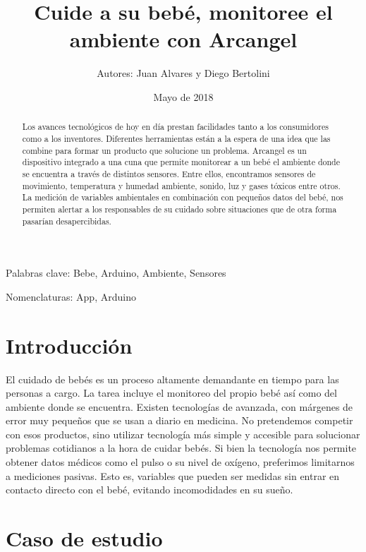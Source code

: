 \documentclass{IEEEtran}
\begin{document}
	\title{Cuide a su bebé, monitoree el ambiente con Arcangel}
	\author{Autores: Juan Alvares y Diego Bertolini}
	\date{Mayo de 2018}	
	\maketitle
	
	\begin{abstract}
		Los avances tecnológicos de hoy en día prestan facilidades tanto a los consumidores como a los inventores. Diferentes herramientas están a la espera de una idea que las combine para formar un producto que solucione un problema.
        Arcangel es un dispositivo integrado a una cuna que permite monitorear a un bebé el ambiente donde se encuentra a través de distintos sensores. Entre ellos, encontramos sensores de movimiento, temperatura y humedad ambiente, sonido, luz y gases tóxicos entre otros. 
        La medición de variables ambientales en combinación con pequeños datos del bebé, nos permiten alertar a los responsables de su cuidado sobre situaciones que de otra forma pasarían desapercibidas.
	\end{abstract}
	
	Palabras clave: Bebe, Arduino, Ambiente, Sensores
	
	Nomenclaturas: App, Arduino

	\section{Introducción}
	
	
		El cuidado de bebés es un proceso altamente demandante en tiempo para las personas a cargo. La tarea incluye el monitoreo del propio bebé así como del ambiente donde se encuentra. 
Existen tecnologías de avanzada, con márgenes de error muy pequeños que se usan a diario en medicina. No pretendemos competir con esos productos, sino utilizar tecnología más simple y accesible para solucionar problemas cotidianos a la hora de cuidar bebés.
Si bien la tecnología nos permite obtener datos médicos como el pulso o su nivel de oxígeno, preferimos limitarnos a mediciones pasivas. Esto es, variables que pueden ser medidas sin entrar en contacto directo con el bebé, evitando incomodidades en su sueño.


	\section{Caso de estudio}
\end{document}
